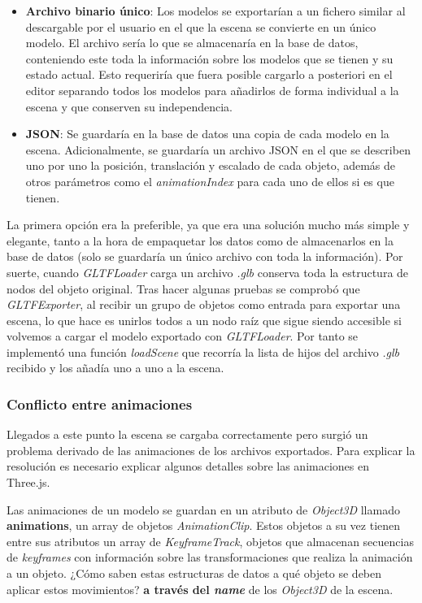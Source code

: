 \begin{itemize}
    \item \textbf{Archivo binario único}: Los modelos se exportarían a un fichero similar al descargable por el usuario en el que la escena se convierte en un único modelo. El archivo sería lo que se almacenaría en la base de datos, conteniendo este toda la información sobre los modelos que se tienen y su estado actual. Esto requeriría que fuera posible cargarlo a posteriori en el editor separando todos los modelos para añadirlos de forma individual a la escena y que conserven su independencia.
    
    \item \textbf{JSON}: Se guardaría en la base de datos una copia de cada modelo en la escena. Adicionalmente, se guardaría un archivo JSON en el que se describen uno por uno la posición, translación y escalado de cada objeto, además de otros parámetros como el \textit{animationIndex} para cada uno de ellos si es que tienen.
\end{itemize}

La primera opción era la preferible, ya que era una solución mucho más simple y elegante, tanto a la hora de empaquetar los datos como de almacenarlos en la base de datos (solo se guardaría un único archivo con toda la información). Por suerte, cuando \textit{GLTFLoader} carga un archivo \textit{.glb} conserva toda la estructura de nodos del objeto original. Tras hacer algunas pruebas se comprobó que \textit{GLTFExporter}, al recibir un grupo de objetos como entrada para exportar una escena, lo que hace es unirlos todos a un nodo raíz que sigue siendo accesible si volvemos a cargar el modelo exportado con \textit{GLTFLoader}. Por tanto se implementó una función \textit{loadScene} que recorría la lista de hijos del archivo \textit{.glb} recibido y los añadía uno a uno a la escena. 

\subsubsection{Conflicto entre animaciones}

Llegados a este punto la escena se cargaba correctamente pero surgió un problema derivado de las animaciones de los archivos exportados. Para explicar la resolución es necesario explicar algunos detalles sobre las animaciones en Three.js.

Las animaciones de un modelo se guardan en un atributo de \textit{Object3D} llamado \textbf{animations}, un array de objetos \textit{AnimationClip}. Estos objetos a su vez tienen entre sus atributos un array de \textit{KeyframeTrack}, objetos que almacenan secuencias de \textit{keyframes} con información sobre las transformaciones que realiza la animación a un objeto. ¿Cómo saben estas estructuras de datos a qué objeto se deben aplicar estos movimientos? \textbf{a través del \textit{name}} de los \textit{Object3D} de la escena.


